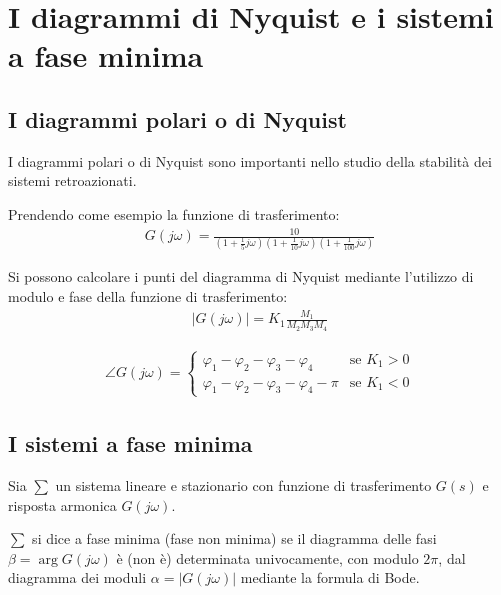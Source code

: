 \section{I diagrammi di Nyquist e i sistemi a fase minima}

\subsection{I diagrammi polari o di Nyquist}
I diagrammi polari o di Nyquist sono importanti nello studio della stabilità
dei sistemi retroazionati.

Prendendo come esempio la funzione di trasferimento:
\begin{align}
    G(j\omega) = \frac{10}{(1 + \frac{1}{5} j\omega)(1 + \frac{1}{10} j\omega)(1 + \frac{1}{100} j\omega)}
\end{align}



Si possono calcolare i punti del diagramma di Nyquist mediante l'utilizzo di 
modulo e fase della funzione di trasferimento:
\begin{align}
    |G(j\omega)| = K_1 \frac{M_1}{M_2 M_3 M_4}
\end{align}

\begin{align}
    \angle G(j\omega) = \begin{cases}
        \varphi_1 - \varphi_2 - \varphi_3 - \varphi_4 & \text{se } K_1 > 0 \\
        \varphi_1 - \varphi_2 - \varphi_3 - \varphi_4 - \pi & \text{se } K_1 < 0
    \end{cases}
\end{align}


\subsection{I sistemi a fase minima}

\begin{definition}
    Sia $\sum$ un sistema lineare e stazionario con funzione di trasferimento
    $G(s)$ e risposta armonica $G(j\omega)$.
    
    $\sum$ si dice a fase minima (fase non minima) se il diagramma delle fasi
    $\beta = \arg G(j\omega)$ è (non è) determinata univocamente, con modulo $2\pi$,
    dal diagramma dei moduli $\alpha = |G(j\omega)|$ mediante la formula di Bode.
\end{definition}

